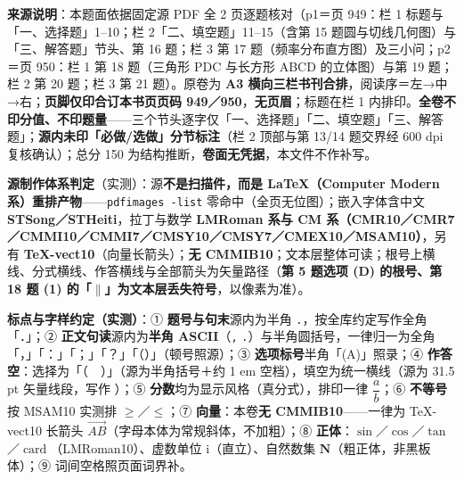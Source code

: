 


\begin{gktip}
\textbf{来源说明}：本题面依据固定源 PDF 全 2 页逐题核对（p1＝页 949：栏 1 标题与「一、选择题」1–10；栏 2「二、填空题」11–15（含第 15 题圆与切线几何图）与「三、解答题」节头、第 16 题；栏 3 第 17 题（频率分布直方图）及三小问；p2＝页 950：栏 1 第 18 题（三角形 PDC 与长方形 ABCD 的立体图）与第 19 题；栏 2 第 20 题；栏 3 第 21 题）。原卷为 \textbf{A3 横向三栏书刊合排}，阅读序＝左→中→右；\textbf{页脚仅印合订本书页页码 949／950}，\textbf{无页眉}；标题在栏 1 内排印。\textbf{全卷不印分值、不印题量}——三个节头逐字仅「一、选择题」「二、填空题」「三、解答题」；\textbf{源内未印「必做/选做」分节标注}（栏 2 顶部与第 13/14 题交界经 600 dpi 复核确认）；总分 150 为结构推断，\textbf{卷面无凭据}，本文件不作补写。

\textbf{源制作体系判定}（实测）：源\textbf{不是扫描件，而是 LaTeX（Computer Modern 系）重排产物}——\texttt{pdfimages -list} 零命中（全页无位图）；嵌入字体含中文 \textbf{STSong／STHeiti}，拉丁与数学 \textbf{LMRoman 系与 CM 系（CMR10／CMR7／CMMI10／CMMI7／CMSY10／CMSY7／CMEX10／MSAM10）}，另有 \textbf{TeX-vect10}（向量长箭头）；\textbf{无 CMMIB10}；文本层整体可读；根号上横线、分式横线、作答横线与全部箭头为矢量路径（\textbf{第 5 题选项 (D) 的根号、第 18 题 (1) 的「$\parallel$」为文本层丢失符号}，以像素为准）。

\textbf{标点与字样约定（实测）}：① \textbf{题号与句末}源内为半角 \texttt{.}，按全库约定写作全角「．」；② \textbf{正文句读}源内为\textbf{半角 ASCII}（\texttt{,} \texttt{.}）与半角圆括号，一律归一为全角「，」「：」「；」「？」「（）」（顿号照源）；③ \textbf{选项标号}半角「(A)」照录；④ \textbf{作答空}：选择为「（　）」（源为半角括号＋约 1 em 空档），填空为统一横线（源为 31.5 pt 矢量线段，写作 \texttt{\gkblank{}}）；⑤ \textbf{分数}均为显示风格（真分式），排印一律 \(\dfrac{a}{b}\)；⑥ \textbf{不等号}按 MSAM10 实测排 \(\geqslant\)／\(\leqslant\)；⑦ \textbf{向量}：本卷\textbf{无 CMMIB10}——一律为 TeX-vect10 长箭头 \(\overrightarrow{AB}\)（字母本体为常规斜体，不加粗）；⑧ \textbf{正体}：\(\sin\)／\(\cos\)／\(\tan\)／\(\operatorname{card}\)（LMRoman10）、虚数单位 \(\mathrm{i}\)（直立）、自然数集 \(\mathbf{N}\)（粗正体，非黑板体）；⑨ 词间空格照页面词界补。


\end{gktip}
